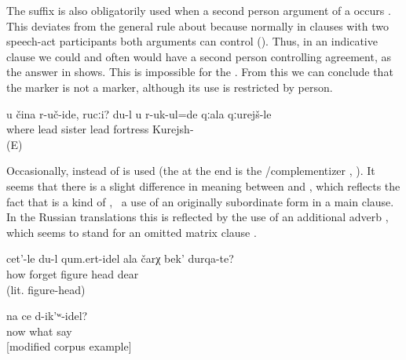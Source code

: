 The suffix is also obligatorily used when a second person  argument of a  occurs . This deviates from the general rule about  because normally in clauses with two speech-act participants both arguments can control  (). Thus, in an indicative clause we could and often would have a second person controlling agreement, as the answer in  shows. This is impossible for the . From this we can conclude that the  marker is not a  marker, although its use is restricted by person.
%
\begin{exe}
	\ex	\label{ex:Where should I bring you, sister}
	\gll	u	čina	r-uč-ide,	rucːi?	du-l u r-uk-ul=de qːala qːurejš-le\\
			where	lead	sister	  lead	fortress	Kurejsh-\\
	\glt	{} (E)
\end{exe}

Occasionally,  instead of  is used (the  at the end is the \slash complementizer , ). It seems that there is a slight difference in meaning between  and , which reflects the fact that  is a kind of , \tie\ a use of an originally subordinate form in a main clause. In the Russian translations this is reflected by the use of an additional adverb  , which seems to stand for an omitted matrix clause .
%
\begin{exe}
	\ex	\label{ex:How can I forget your dear figure}
	\gll	cet'-le	du-l	qum.ert-idel 	ala	čarχ		bek'	durqa-te?\\
		how		forget	 figure		head	dear\\
	\glt	{} (lit. figure-head)

	\ex	\label{ex:‎‎Now what can we sayModified}
	\gll	na	ce	d-ik'ʷ-idel?\\
		now	what	say\\
	\glt	{} [modified corpus example]
\end{exe}

